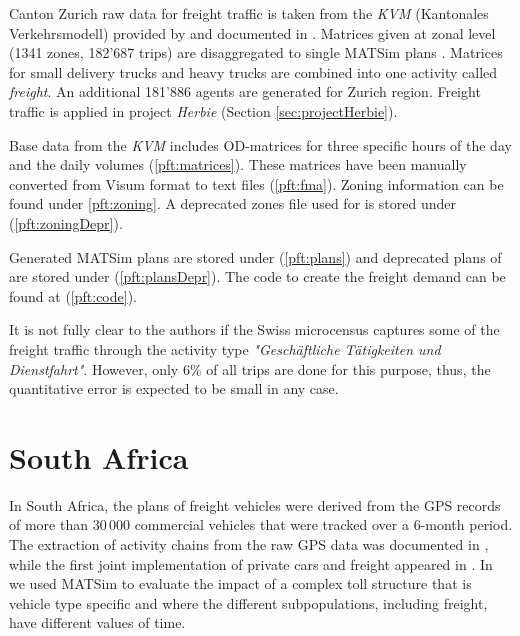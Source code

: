 Canton Zurich raw data for freight traffic is taken from the \emph{KVM} (Kantonales Verkehrsmodell) provided by \citet{AMV_Webpage_2011} and documented in \citet[][]{GottardiBuergler_SV_1999}. Matrices given at zonal level (1341 zones, 182'687 trips) are disaggregated to single MATSim plans \citep[][]{ShahM_TechRep_IVT_2010}. Matrices for small delivery trucks and heavy trucks are combined into one activity called \emph{freight}. An additional 181'886 agents are generated for Zurich region. Freight traffic is applied in project \emph{Herbie} (Section \ref{sec:projectHerbie}).

Base data from the \emph{KVM} includes OD-matrices for three specific hours of the day and the daily volumes (\ref{pft:matrices}). These matrices have been manually converted from Visum format to text files (\ref{pft:fma}). Zoning information can be found under \ref{pft:zoning}. A deprecated zones file used for \citet[][]{ShahM_TechRep_IVT_2010} is stored under (\ref{pft:zoningDepr}).

Generated MATSim plans are stored under (\ref{pft:plans}) and deprecated plans of \citet[][]{ShahM_TechRep_IVT_2010} are stored under (\ref{pft:plansDepr}). The code to create the freight demand can be found at (\ref{pft:code}).

It is not fully clear to the authors if the Swiss microcensus captures some of the freight traffic through the activity type \emph{"Geschäftliche Tätigkeiten und Dienstfahrt"}. However, only $6\%$ of all trips are done for this purpose, thus, the quantitative error is expected to be small in any case.

\section{South Africa}
In South Africa, the plans of freight vehicles were derived from the GPS records of more than 30\,000 commercial vehicles  that were tracked over a 6-month period. The extraction of activity chains from the raw GPS data was documented in \citet[][]{JoubertAxhausen_JTG_2011}, while the first joint implementation of private cars and freight appeared in \citet[][]{JoubertJEtAl_TRR_2010}. In \citet[][]{NagelKickhoeferJoubert2014HeterogeneousVoTsPROCEDIA} we used MATSim to evaluate the impact of a complex toll structure that is vehicle type specific and where the different subpopulations, including freight, have different values of time.

